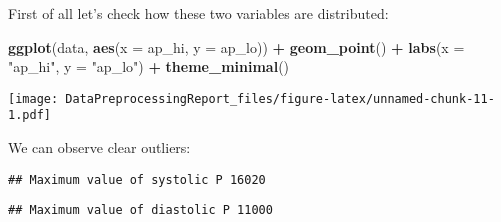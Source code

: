 \documentclass[
]{article}
\newenvironment{Shaded}{\begin{snugshade}}{\end{snugshade}}
\newcommand{\AttributeTok}[1]{\textcolor[rgb]{0.13,0.29,0.53}{#1}}
\newcommand{\FunctionTok}[1]{\textcolor[rgb]{0.13,0.29,0.53}{\textbf{#1}}}
\newcommand{\NormalTok}[1]{#1}
\newcommand{\SpecialCharTok}[1]{\textcolor[rgb]{0.81,0.36,0.00}{\textbf{#1}}}
\newcommand{\StringTok}[1]{\textcolor[rgb]{0.31,0.60,0.02}{#1}}
\begin{document}
First of all let's check how these two variables are distributed:

\begin{Shaded}
\begin{Highlighting}[]
\FunctionTok{ggplot}\NormalTok{(data, }\FunctionTok{aes}\NormalTok{(}\AttributeTok{x =}\NormalTok{ ap\_hi, }\AttributeTok{y =}\NormalTok{ ap\_lo)) }\SpecialCharTok{+}
  \FunctionTok{geom\_point}\NormalTok{() }\SpecialCharTok{+}
  \FunctionTok{labs}\NormalTok{(}\AttributeTok{x =} \StringTok{"ap\_hi"}\NormalTok{, }\AttributeTok{y =} \StringTok{"ap\_lo"}\NormalTok{) }\SpecialCharTok{+}
  \FunctionTok{theme\_minimal}\NormalTok{()}
\end{Highlighting}
\end{Shaded}

\texttt{[image: DataPreprocessingReport\_files/figure-latex/unnamed-chunk-11-1.pdf]}

We can observe clear outliers:

\begin{Shaded}
\end{Shaded}

\begin{verbatim}
## Maximum value of systolic P 16020
\end{verbatim}

\begin{Shaded}
\end{Shaded}

\begin{verbatim}
## Maximum value of diastolic P 11000
\end{verbatim}

\begin{Shaded}
\end{Shaded}
\end{document}
